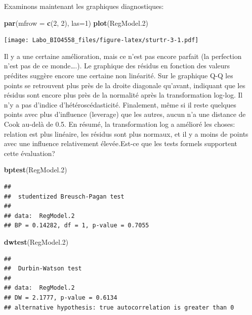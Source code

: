 \documentclass[12pt,]{book}
\newenvironment{Shaded}{\begin{snugshade}}{\end{snugshade}}
\newcommand{\DataTypeTok}[1]{\textcolor[rgb]{0.27,0.27,0.27}{#1}}
\newcommand{\DecValTok}[1]{\textcolor[rgb]{0.06,0.06,0.06}{#1}}
\newcommand{\FloatTok}[1]{\textcolor[rgb]{0.06,0.06,0.06}{#1}}
\newcommand{\KeywordTok}[1]{\textcolor[rgb]{0.27,0.27,0.27}{\textbf{#1}}}
\newcommand{\NormalTok}[1]{#1}
\begin{document}
Examinons maintenant les graphiques diagnostiques:

\begin{Shaded}
\begin{Highlighting}[]
\KeywordTok{par}\NormalTok{(}\DataTypeTok{mfrow =} \KeywordTok{c}\NormalTok{(}\DecValTok{2}\NormalTok{, }\DecValTok{2}\NormalTok{), }\DataTypeTok{las=}\DecValTok{1}\NormalTok{)}
\KeywordTok{plot}\NormalTok{(RegModel}\FloatTok{.2}\NormalTok{)}
\end{Highlighting}
\end{Shaded}

\texttt{[image: Labo\_BIO4558\_files/figure-latex/sturtr-3-1.pdf]}

Il y a une certaine amélioration, mais ce n'est pas encore parfait (la perfection n'est pas de ce monde\ldots{}.). Le graphique des résidus en fonction des valeurs prédites suggère encore une certaine non linéarité. Sur le graphique Q-Q les points se retrouvent plus près de la droite diagonale qu'avant, indiquant que les résidus sont encore plus près de la normalité après la transformation log-log. Il n'y a pas d'indice d'hétéroscédasticité. Finalement, même si il reste quelques points avec plus d'influence (leverage) que les autres, aucun n'a une distance de Cook au-delà de 0.5. En résumé, la transformation log a amélioré les choses: relation est plus linéaire, les résidus sont plus normaux, et il y a moins de points avec une influence relativement élevée.Est-ce que les tests formels supportent cette évaluation?

\begin{Shaded}
\begin{Highlighting}[]
\KeywordTok{bptest}\NormalTok{(RegModel}\FloatTok{.2}\NormalTok{)}
\end{Highlighting}
\end{Shaded}

\begin{verbatim}
## 
## 	studentized Breusch-Pagan test
## 
## data:  RegModel.2
## BP = 0.14282, df = 1, p-value = 0.7055
\end{verbatim}

\begin{Shaded}
\begin{Highlighting}[]
\KeywordTok{dwtest}\NormalTok{(RegModel}\FloatTok{.2}\NormalTok{)}
\end{Highlighting}
\end{Shaded}

\begin{verbatim}
## 
## 	Durbin-Watson test
## 
## data:  RegModel.2
## DW = 2.1777, p-value = 0.6134
## alternative hypothesis: true autocorrelation is greater than 0
\end{verbatim}
\end{document}
